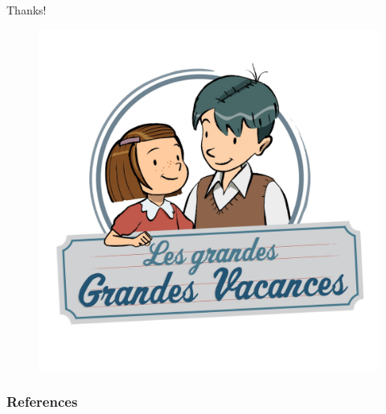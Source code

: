 \documentclass[10pt,mathserif,aspectratio=169]{beamer}
\begin{document}

\begin{frame}{Thanks!}
  \begin{figure}
    \centering
    \includegraphics[height=0.5\textwidth]{../Figures/grandesvacanes.jpg}
  \end{figure}
\end{frame}

\begin{frame}[allowframebreaks]
  \frametitle{References}
  
  
\end{frame}


\end{document}
